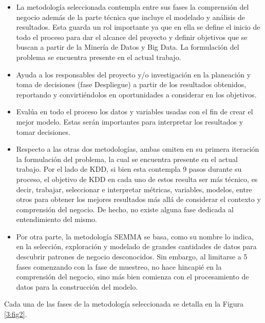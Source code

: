 \begin{itemize}
	\item La metodología seleccionada contempla entre sus fases la comprensión del negocio además de la parte técnica que incluye el modelado y análisis de resultados. Esta guarda un rol importante ya que en ella se define el inicio de todo el proceso para dar el alcance del proyecto y definir objetivos que se buscan a partir de la Minería de Datos y Big Data. La formulación del problema se encuentra presente en el actual trabajo.
	\item Ayuda a los responsables del proyecto y/o investigación en la planeación y toma de decisiones (fase Despliegue) a partir de los resultados obtenidos, reportando y convirtiéndolos en oportunidades a considerar en los objetivos.
	\item Evalúa en todo el proceso los datos y variables usadas con el fin de crear el mejor modelo. Estas serán importantes para interpretar los resultados y tomar decisiones.
	\item Respecto a las otras dos metodologías, ambas omiten en su primera iteración la formulación del problema, la cual se encuentra presente en el actual trabajo. Por el lado de KDD, si bien esta contempla 9 pasos durante su proceso, el objetivo de KDD en cada uno de estos resulta ser más técnico, es decir, trabajar, seleccionar e interpretar métricas, variables, modelos, entre otros para obtener los mejores resultados más allá de considerar el contexto y comprensión del negocio. De hecho, no existe alguna fase dedicada al entendimiento del mismo.
	\item Por otra parte, la metodología SEMMA se basa, como su nombre lo indica, en la selección, exploración y modelado de grandes cantidades de datos para descubrir patrones de negocio desconocidos. Sin embargo, al limitarse a 5 fases comenzando con la fase de muestreo, no hace hincapié en la comprensión del negocio, sino más bien comienza con el procesamiento de datos para la construcción del modelo.
\end{itemize}

Cada una de las fases de la metodología seleccionada se detalla en la Figura \ref{3:fig2}.

